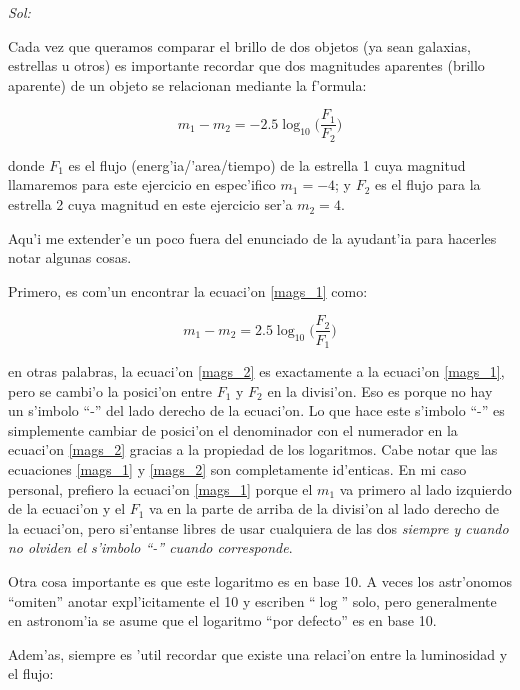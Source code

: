 \documentclass{article}
\begin{document}
\begin{enumerate}[a)]
\emph{Sol:}

\vspace{2mm}

Cada vez que queramos comparar el brillo de dos objetos (ya sean galaxias, estrellas u otros) es importante recordar que dos magnitudes aparentes (brillo aparente) de un objeto se relacionan mediante la f'ormula:


\begin{equation} \label{mags_1}
m_1 - m_2 = -2.5 \log_{10} \bigg( \frac{F_1}{F_2} \bigg)
\end{equation}

donde $F_1$ es el flujo (energ'ia/'area/tiempo) de la estrella 1 cuya magnitud llamaremos para este ejercicio en espec'ifico $m_1 = -4$; y $F_2$ es el flujo para la estrella 2 cuya magnitud en este ejercicio ser'a $m_2 = 4$.

Aqu'i me extender'e un poco fuera del enunciado de la ayudant'ia para hacerles notar algunas cosas.

Primero, es com'un encontrar la ecuaci'on \eqref{mags_1} como:

\begin{equation} \label{mags_2}
m_1 - m_2 = 2.5 \log_{10} \bigg( \frac{F_2}{F_1} \bigg)
\end{equation}

en otras palabras, la ecuaci'on \eqref{mags_2} es exactamente a la ecuaci'on \eqref{mags_1}, pero se cambi'o la posici'on entre $F_1$ y $F_2$ en la divisi'on. Eso es porque no hay un s'imbolo ``-'' del lado derecho de la ecuaci'on. Lo que hace este s'imbolo ``-'' es simplemente cambiar de posici'on el denominador con el numerador en la ecuaci'on \eqref{mags_2} gracias a la propiedad de los logaritmos. Cabe notar que las ecuaciones \eqref{mags_1} y \eqref{mags_2} son completamente id'enticas. En mi caso personal, prefiero la ecuaci'on \eqref{mags_1} porque el $m_1$ va primero al lado izquierdo de la ecuaci'on y el $F_1$ va en la parte de arriba de la divisi'on al lado derecho de la ecuaci'on, pero si'entanse libres de usar cualquiera de las dos \emph{siempre y cuando no olviden el s'imbolo ``-'' cuando corresponde}. 

Otra cosa importante es que este logaritmo es en base 10. A veces los astr'onomos ``omiten'' anotar expl'icitamente el 10 y escriben ``$\log$'' solo, pero generalmente en astronom'ia se asume que el logaritmo ``por defecto'' es en base 10.

Adem'as, siempre es 'util recordar que existe una relaci'on entre la luminosidad y el flujo:


\end{enumerate}
\end{document}
